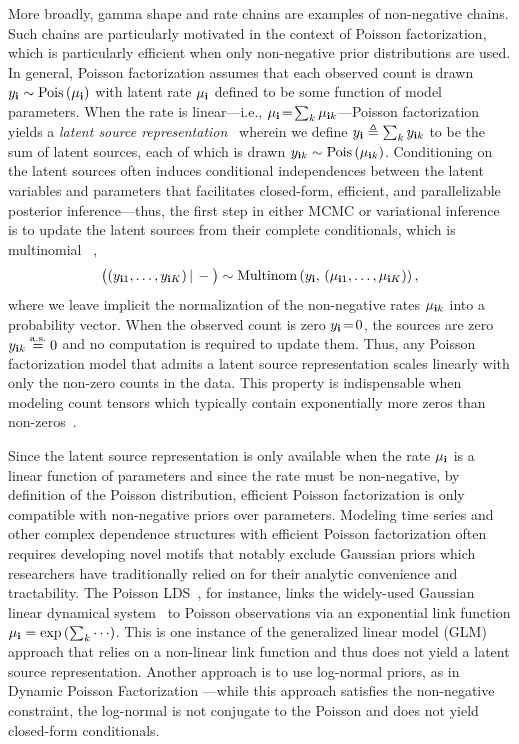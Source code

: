 \documentclass{article}
\begin{document}
More broadly, gamma shape and rate chains are examples of non-negative chains. Such chains are particularly motivated in the context of Poisson factorization, which is particularly efficient when only non-negative prior distributions are used. In general, Poisson factorization assumes that each observed count is drawn $y_{\textbf{\textrm{i}}} \sim \textrm{Pois}\left( \mu_{\textbf{\textrm{i}}} \right)$ with latent rate $\mu_{\textbf{\textrm{i}}}$ defined to be some function of model parameters. When the rate is linear---i.e., $\mu_{\textbf{\textrm{i}}} \!=\! \sum_{k}\mu_{\textbf{\textrm{i}} k}$---Poisson factorization yields a \emph{latent source representation}~\cite{Dunson2005bayesianlatent,cemgil2009bayesian} wherein we define $y_{\textbf{\textrm{i}}} \triangleq \sum_k y_{\textbf{\textrm{i}} k}$ to be the sum of latent sources, each of which is drawn $y_{\textbf{\textrm{i}} k} \sim \textrm{Pois}\left( \mu_{\textbf{\textrm{i}} k} \right)$. Conditioning on the latent sources often induces conditional independences between the latent variables and parameters that facilitates closed-form, efficient, and parallelizable posterior inference---thus, the first step in either MCMC or variational inference is to update the latent sources from their complete conditionals, which is multinomial \cite{steel1953relation}~,
\begin{equation}
\label{eq:thinning}
\big((y_{\textbf{\textrm{i}}1},\dots,y_{\textbf{\textrm{i}} K})\,|\,-\big) \sim \textrm{Multinom}\left( y_{\textbf{\textrm{i}}},\, (\mu_{\textbf{\textrm{i}} 1},\dots, \mu_{\textbf{\textrm{i}} K}) \right),
\end{equation}
where we leave implicit the normalization of the non-negative rates $\mu_{\textbf{\textrm{i}} k}$ into a probability vector. When the observed count is zero $y_{\textbf{\textrm{i}}} \!=\! 0$, the sources are zero $y_{\textbf{\textrm{i}} k} \stackrel{\textrm{a.s.}}{=}0$ and no computation is required to update them. Thus, any Poisson factorization model that admits a latent source representation scales linearly with only the non-zero counts in the data. This property is indispensable when modeling count tensors which typically contain exponentially more zeros than non-zeros~\cite{bhattacharya2012simplex}. 

Since the latent source representation is only available when the rate $\mu_{\textbf{\textrm{i}}}$ is a linear function of parameters and since the rate must be non-negative, by definition of the Poisson distribution, efficient Poisson factorization is only compatible with non-negative priors over parameters. Modeling time series and other complex dependence structures with efficient Poisson factorization often requires developing novel motifs that notably exclude Gaussian priors which researchers have traditionally relied on for their analytic convenience and tractability. The Poisson LDS~\cite{smith2003estimating, paninski2010new, macke2011empirical}, for instance, links the widely-used Gaussian linear dynamical system~\cite{kalman1961new,ghahramani1999learning} to  Poisson observations via an exponential link function $\mu_{\textbf{\textrm{i}}} = \exp\left({\sum_k \cdots}\right)$. This is one instance of the generalized linear model (GLM) \cite{nelder1972generalized} approach that relies on a non-linear link function and thus does not yield a latent source representation. Another approach is to use log-normal priors, as in Dynamic Poisson Factorization \cite{charlin2015dynamic}---while this approach satisfies the non-negative constraint, the log-normal is not conjugate to the Poisson and does not yield closed-form conditionals. 
\end{document}
